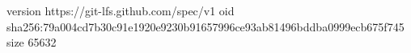 version https://git-lfs.github.com/spec/v1
oid sha256:79a004cd7b30c91e1920e9230b91657996ce93ab81496bddba0999ecb675f745
size 65632
